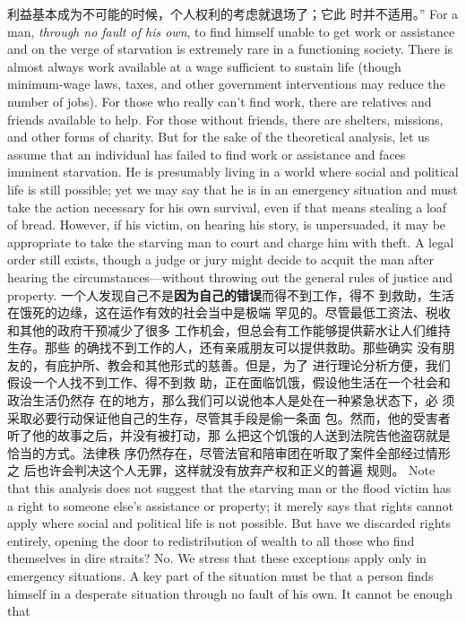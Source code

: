 \begin{paracol}{2}
利益基本成为不可能的时候，个人权利的考虑就退场了；它此
时并不适用。”
\switchcolumn*
For a man, \textit{through no fault of his own}, to find himself unable to get work or assistance and on the verge of starvation is
extremely rare in a functioning society. There is almost always
work available at a wage sufficient to sustain life (though minimum-wage laws, taxes, and other government interventions
may reduce the number of jobs). For those who really can't find
work, there are relatives and friends available to help. For those
without friends, there are shelters, missions, and other forms of
charity. But for the sake of the theoretical analysis, let us assume that an individual has failed to find work or assistance and
faces imminent starvation. He is presumably living in a world
where social and political life is still possible; yet we may say that he is in an emergency situation and must take the action
necessary for his own survival, even if that means stealing a loaf
of bread. However, if his victim, on hearing his story, is unpersuaded, it may be appropriate to take the starving man to court
and charge him with theft. A legal order still exists, though a
judge or jury might decide to acquit the man after hearing the
circumstances---without throwing out the general rules of justice and property.
\switchcolumn
一个人发现自己不是\textbf{因为自己的错误}而得不到工作，得不
到救助，生活在饿死的边缘，这在运作有效的社会当中是极端
罕见的。尽管最低工资法、税收和其他的政府干预减少了很多
工作机会，但总会有工作能够提供薪水让人们维持生存。那些
的确找不到工作的人，还有亲戚朋友可以提供救助。那些确实
没有朋友的，有庇护所、教会和其他形式的慈善。但是，为了
进行理论分析方便，我们假设一个人找不到工作、得不到救
助，正在面临饥饿，假设他生活在一个社会和政治生活仍然存
在的地方，那么我们可以说他本人是处在一种紧急状态下，必
须采取必要行动保证他自己的生存，尽管其手段是偷一条面
包。然而，他的受害者听了他的故事之后，并没有被打动，那
么把这个饥饿的人送到法院告他盗窃就是恰当的方式。法律秩
序仍然存在，尽管法官和陪审团在听取了案件全部经过情形之
后也许会判决这个人无罪，这样就没有放弃产权和正义的普遍
规则。
\switchcolumn*
Note that this analysis does not suggest that the starving
man or the flood victim has a right to someone else's assistance
or property; it merely says that rights cannot apply where social
and political life is not possible. But have we discarded rights
entirely, opening the door to redistribution of wealth to all
those who find themselves in dire straits? No. We stress that
these exceptions apply only in emergency situations. A key part
of the situation must be that a person finds himself in a desperate situation through no fault of his own. It cannot be enough that

\end{paracol}

